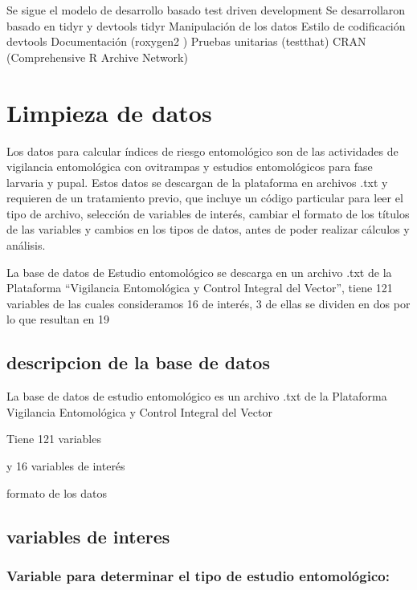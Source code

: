 \documentclass[
  letterpaper,
]{scrbook}
\begin{document}
Se sigue el modelo de desarrollo basado test driven development Se
desarrollaron basado en tidyr y devtools tidyr Manipulación de los datos
Estilo de codificación devtools Documentación (roxygen2 ) Pruebas
unitarias (testthat) CRAN (Comprehensive R Archive Network)


\chapter{Limpieza de datos}\label{limpieza-de-datos}

Los datos para calcular índices de riesgo entomológico son de las
actividades de vigilancia entomológica con ovitrampas y estudios
entomológicos para fase larvaria y pupal. Estos datos se descargan de la
plataforma en archivos .txt y requieren de un tratamiento previo, que
incluye un código particular para leer el tipo de archivo, selección de
variables de interés, cambiar el formato de los títulos de las variables
y cambios en los tipos de datos, antes de poder realizar cálculos y
análisis.

La base de datos de Estudio entomológico se descarga en un archivo .txt
de la Plataforma ``Vigilancia Entomológica y Control Integral del
Vector'', tiene 121 variables de las cuales consideramos 16 de interés,
3 de ellas se dividen en dos por lo que resultan en 19

\section{descripcion de la base de
datos}\label{descripcion-de-la-base-de-datos}

La base de datos de estudio entomológico es un archivo .txt de la
Plataforma Vigilancia Entomológica y Control Integral del Vector

Tiene 121 variables

y 16 variables de interés

formato de los datos

\section{variables de interes}\label{variables-de-interes}

\subsection{Variable para determinar el tipo de estudio
entomológico:}\label{variable-para-determinar-el-tipo-de-estudio-entomoluxf3gico}
\end{document}
